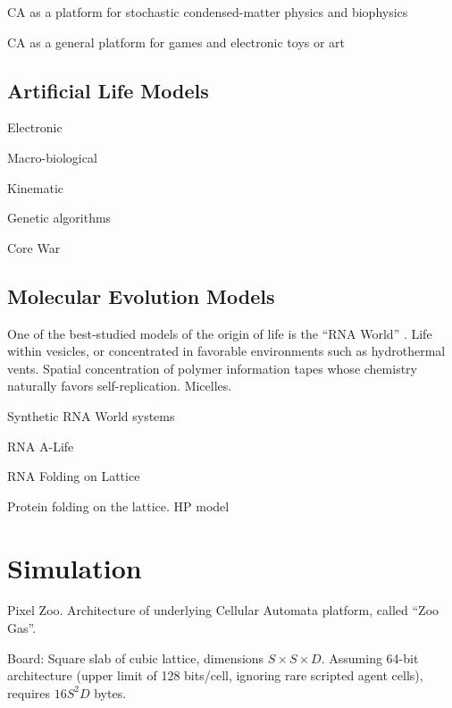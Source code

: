 \documentclass{acm_proc_article-sp}
\begin{document}
CA as a platform for stochastic condensed-matter physics and biophysics
\cite{Schiff2007}

CA as a general platform for games
\cite{SimCity,DwarfFortress,Minecraft}
and electronic toys or art \cite{RuckerCAPOW,PowderToy}

\subsection{Artificial Life Models}

Electronic
\cite{VonNeumannBook,Wireworld}

Macro-biological
\cite{ConwaysLife,Langton1986}

Kinematic
\cite{Stevens2011}

Genetic algorithms
\cite{Tierra,Avida}

Core War
\cite{CoreWarGuidelines84,CoreWarDewdney85,BarkleyWaitSchmidtCoreWar2004}

\subsection{Molecular Evolution Models}

One of the best-studied models of the origin of life is the ``RNA World''
\cite{Woese1967}.
Life within vesicles, or concentrated in favorable environments such as hydrothermal vents.  %
Spatial concentration of polymer information tapes whose chemistry naturally favors self-replication.
Micelles.

Synthetic RNA World systems
\cite{PaulJoyce2002}

RNA A-Life
\cite{journals/alife/Schuster94}

RNA Folding on Lattice
\cite{LeoniVanderzande2003,JostEveraers2010,ZaraPretti2007,GillespieMayneJiang2009}

Protein folding on the lattice. HP model \cite{Dill1985,PandeRokhsar1999}

\section{Simulation}

Pixel Zoo.
Architecture of underlying Cellular Automata platform, called ``Zoo Gas''.

Board:
Square slab of cubic lattice, dimensions $S \times S \times D$.
Assuming 64-bit architecture (upper limit of 128 bits/cell, ignoring rare scripted agent cells), requires $16S^2 D$ bytes.
\end{document}
